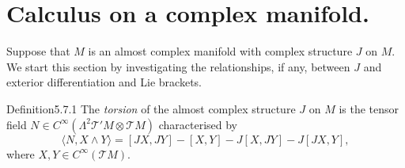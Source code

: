 \section{Calculus on a complex manifold.}\label{sec:5:7}
Suppose that $M$ is an almost complex manifold with complex structure $J$ on $M$. We start this section by investigating the relationships, if any, between $J$ and exterior differentiation and Lie brackets.
\begin{originaltheorem}{Definition}{5.7.1}
The \emph{torsion} of the almost complex structure $J$ on $M$ is the tensor field $N\in C^\infty(\Lambda^2\mathcal T'M\otimes\mathcal TM)$ characterised by
\[\langle N,X\wedge Y\rangle=[JX,JY]-[X,Y]-J[X,JY]-J[JX,Y],\]
where $X,Y\in C^\infty(\mathcal TM)$.
\end{originaltheorem}
